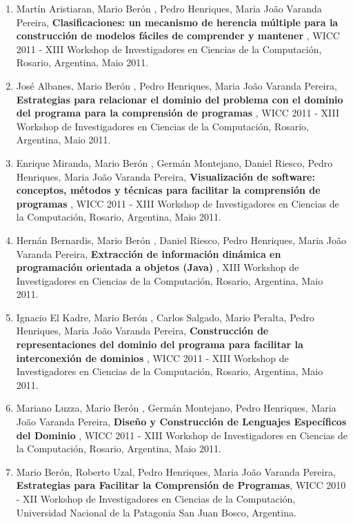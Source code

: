 \documentclass[11pt]{article}
\begin{document}
\begin{enumerate}
\item {Martín Aristiaran,  Mario Berón , Pedro Henriques, Maria João Varanda Pereira, {\bf{ Clasificaciones: un mecanismo de herencia múltiple para la construcción de modelos fáciles de comprender y mantener}} , WICC 2011 - XIII Workshop de Investigadores en Ciencias de la Computación, Rosario, Argentina, Maio 2011. }

\item {José Albanes,  Mario Berón , Pedro Henriques, Maria João Varanda Pereira, {\bf{ Estrategias para relacionar el dominio del problema con el dominio del programa para la comprensión de programas}} , WICC 2011 - XIII Workshop de Investigadores en Ciencias de la Computación, Rosario, Argentina, Maio 2011. }

\item {Enrique Miranda, Mario Berón , Germán Montejano, Daniel Riesco, Pedro Henriques, Maria João Varanda Pereira, {\bf{ Visualización de software: conceptos, métodos y técnicas para facilitar la comprensión de programas}} , WICC 2011 - XIII Workshop de Investigadores en Ciencias de la Computación, Rosario, Argentina, Maio 2011.}

\item {Hernán Bernardis,  Mario Berón , Daniel Riesco, Pedro Henriques, Maria João Varanda Pereira, {\bf{ Extracción de información dinámica en programación orientada a objetos (Java)}} , XIII Workshop de Investigadores en Ciencias de la Computación, Rosario, Argentina, Maio 2011. }

\item {Ignacio El Kadre,  Mario Berón , Carlos Salgado, Mario Peralta, Pedro Henriques, Maria João Varanda Pereira, {\bf{ Construcción de representaciones del dominio del programa para facilitar la interconexión de dominios}} , WICC 2011 - XIII Workshop de Investigadores en Ciencias de la Computación, Rosario, Argentina, Maio 2011.}

\item {Mariano Luzza,  Mario Berón , Germán Montejano, Pedro Henriques, Maria João Varanda Pereira, {\bf{ Diseño y Construcción de Lenguajes Específicos del Dominio}} , WICC 2011 - XIII Workshop de Investigadores en Ciencias de la Computación, Rosario, Argentina, Maio 2011. }

\item {Mario Berón, Roberto Uzal, Pedro Henriques, Maria João Varanda Pereira, {\bf{ Estrategias para Facilitar la Comprensión de Programas}}, WICC 2010 - XII Workshop de Investigadores en Ciencias de la Computación, Universidad Nacional de la Patagonia San Juan Bosco, Argentina. }


\end{enumerate}
\end{document}
